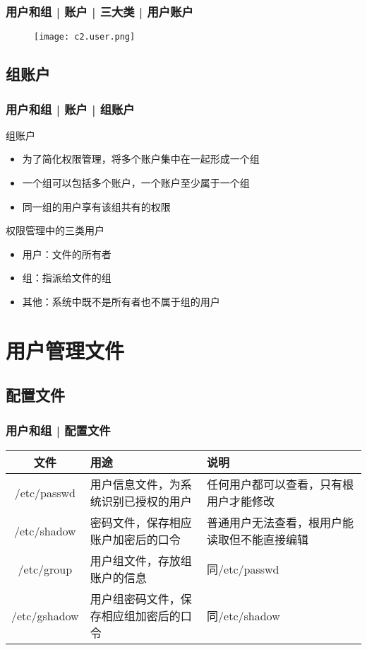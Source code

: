 \begin{frame}
  \frametitle{用户和组 | 账户 | 三大类 | 用户账户}
  \begin{figure}
    \centering
    \texttt{[image: c2.user.png]}
  \end{figure}
\end{frame}

\subsection{组账户}
\begin{frame}
  \frametitle{用户和组 | 账户 | 组账户}
  \begin{block}{组账户}
    \begin{itemize}
      \item 为了简化权限管理，将多个账户集中在一起形成一个组
      \item 一个组可以包括多个账户，一个账户至少属于一个组
      \item 同一组的用户享有该组共有的权限
    \end{itemize}
  \end{block}
  \pause
  \begin{block}{权限管理中的\alert{三类用户}}
    \begin{itemize}
      \item 用户：文件的所有者
      \item 组：指派给文件的组
      \item 其他：系统中既不是所有者也不属于组的用户
    \end{itemize}
  \end{block}
\end{frame}

\section{用户管理文件}
\subsection{配置文件}
\begin{frame}
  \frametitle{用户和组 | \alert{配置文件}}
  \begin{table}
    \centering
    \begin{tabularx}{\textwidth}{cXX}
      \hline
      \rowcolor{blue!50}文件 & 用途 & 说明\\
      \hline
      /etc/passwd & 用户信息文件，为系统识别已授权的用户 & 任何用户都可以查看，只有根用户才能修改\\
      /etc/shadow & 密码文件，保存相应账户加密后的口令 & 普通用户无法查看，根用户能读取但不能直接编辑\\
      /etc/group & 用户组文件，存放组账户的信息 & 同/etc/passwd\\
      /etc/gshadow & 用户组密码文件，保存相应组加密后的口令 & 同/etc/shadow\\
      \hline
    \end{tabularx}
  \end{table}
\end{frame}

